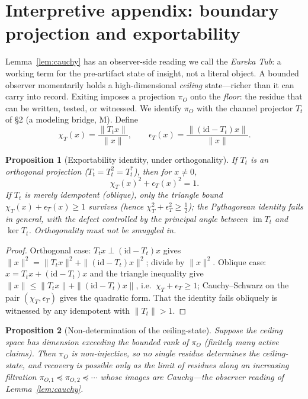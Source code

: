 \documentclass[11pt]{article}
\newtheorem{proposition}{Proposition}
\theoremstyle{definition}
\theoremstyle{remark}
\begin{document}
\section{Interpretive appendix: boundary projection and exportability}\label{sec:eureka}

Lemma~\ref{lem:cauchy} has an observer-side reading we call the \emph{Eureka Tub}: a working term for
the pre-artifact state of insight, not a literal object. A bounded observer momentarily holds a
high-dimensional \emph{ceiling} state---richer than it can carry into record. Exiting imposes a
projection $\pi_O$ onto the \emph{floor}: the residue that can be written, tested, or witnessed. We
identify $\pi_O$ with the channel projector $T_t$ of \S2 (a modeling bridge, M). Define
\[
  \chi_T(x)=\frac{\|T_t x\|}{\|x\|},\qquad
  \epsilon_T(x)=\frac{\|(\mathrm{id}-T_t)x\|}{\|x\|}.
\]

\begin{proposition}[Exportability identity, under orthogonality]\label{prop:chi}
If $T_t$ is an orthogonal projection ($T_t=T_t^2=T_t^{*}$), then for $x\neq0$,
\[
  \chi_T(x)^2+\epsilon_T(x)^2=1 .
\]
If $T_t$ is merely idempotent (oblique), only the triangle bound
$\chi_T(x)+\epsilon_T(x)\ge1$ survives (hence $\chi_T^2+\epsilon_T^2\ge\tfrac12$); the Pythagorean
identity fails in general, with the defect controlled by the principal angle between
$\operatorname{im}T_t$ and $\ker T_t$. Orthogonality must not be smuggled in.
\end{proposition}

\begin{proof}
Orthogonal case: $T_tx\perp(\mathrm{id}-T_t)x$ gives
$\|x\|^2=\|T_tx\|^2+\|(\mathrm{id}-T_t)x\|^2$; divide by $\|x\|^2$. Oblique case:
$x=T_tx+(\mathrm{id}-T_t)x$ and the triangle inequality give
$\|x\|\le\|T_tx\|+\|(\mathrm{id}-T_t)x\|$, i.e.\ $\chi_T+\epsilon_T\ge1$; Cauchy--Schwarz on the
pair $(\chi_T,\epsilon_T)$ gives the quadratic form. That the identity fails obliquely is witnessed
by any idempotent with $\|T_t\|>1$.
\end{proof}

\begin{proposition}[Non-determination of the ceiling-state]\label{prop:skeleton}
Suppose the ceiling space has dimension exceeding the bounded rank of $\pi_O$ (finitely many active
claims). Then $\pi_O$ is non-injective, so no single residue determines the ceiling-state, and
recovery is possible only as the limit of residues along an increasing filtration
$\pi_{O,1}\preceq\pi_{O,2}\preceq\cdots$ whose images are Cauchy---the observer reading of
Lemma~\ref{lem:cauchy}.
\end{proposition}
\end{document}
